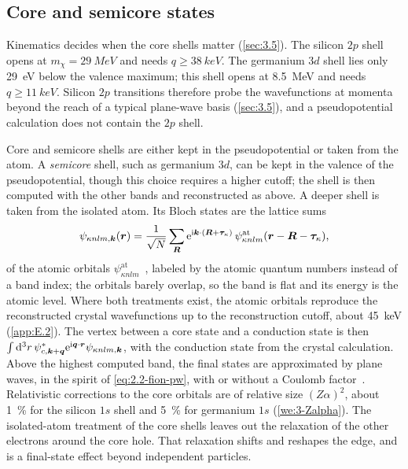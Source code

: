 \subsection{Core and semicore states}

Kinematics decides when the core shells matter (\cref{sec:3.5}). The silicon $2p$ shell opens at $m_\chi = \SI{29}{MeV}$ and needs $q \ge \SI{38}{keV}$. The germanium $3d$ shell lies only \SI{29}{eV} below the valence maximum; this shell opens at \SI{8.5}{MeV} and needs $q \ge \SI{11}{keV}$. Silicon $2p$ transitions therefore probe the wavefunctions at momenta beyond the reach of a typical plane-wave basis (\cref{sec:3.5}), and a pseudopotential calculation does not contain the $2p$ shell.

Core and semicore shells are either kept in the pseudopotential or taken from the atom. A \emph{semicore} shell, such as germanium $3d$, can be kept in the valence of the pseudopotential, though this choice requires a higher cutoff; the shell is then computed with the other bands and reconstructed as above. A deeper shell is taken from the isolated atom. Its Bloch states are the lattice sums
\begin{equation}
  \psi_{\kappa nlm,\bm{k}}(\bm{r}) = \frac{1}{\sqrt N}\sum_{\bm{R}}\mathrm{e}^{\mathrm{i}\bm{k}\cdot(\bm{R}+\bm{\tau}_\kappa)}\,\psi^{\mathrm{at}}_{\kappa nlm}(\bm{r} - \bm{R} - \bm{\tau}_\kappa) ,
  \label{eq:E.7-core}
\end{equation}
of the atomic orbitals $\psi^{\mathrm{at}}_{\kappa nlm}$~\cite[Eq.~(2.8)]{griffin2021extended}, labeled by the atomic quantum numbers instead of a band index; the orbitals barely overlap, so the band is flat and its energy is the atomic level. Where both treatments exist, the atomic orbitals reproduce the reconstructed crystal wavefunctions up to the reconstruction cutoff, about \SI{45}{keV} (\cref{app:E.2}). The vertex between a core state and a conduction state is then $\int\mathrm{d}^3r\,\psi^*_{c,\bm{k}+\bm{q}}\mathrm{e}^{\mathrm{i}\bm{q}\cdot\bm{r}}\psi_{\kappa nlm,\bm{k}}$, with the conduction state from the crystal calculation. Above the highest computed band, the final states are approximated by plane waves, in the spirit of \cref{eq:2.2-fion-pw}, with or without a Coulomb factor~\cite[Sects.~2.3 and~3.4]{griffin2021extended}. Relativistic corrections to the core orbitals are of relative size $(Z\alpha)^2$, about \SI{1}{\percent} for the silicon $1s$ shell and \SI{5}{\percent} for germanium $1s$ (\cref{we:3-Zalpha}). The isolated-atom treatment of the core shells leaves out the relaxation of the other electrons around the core hole. That relaxation shifts and reshapes the edge, and is a final-state effect beyond independent particles.

